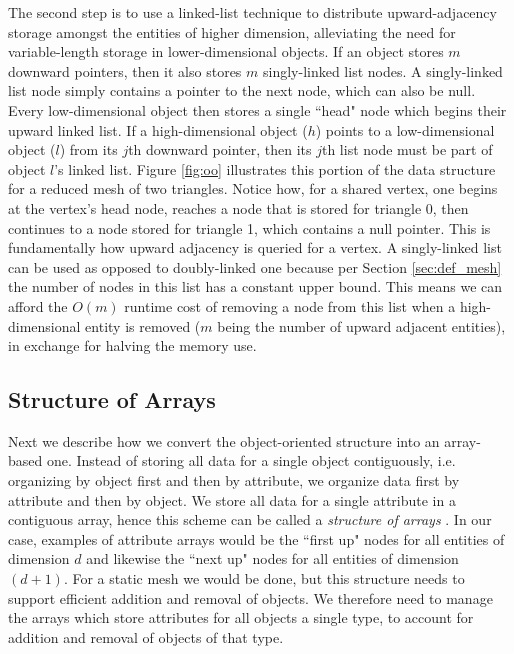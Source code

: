 The second step is to use a linked-list technique \cite{karamete2016novel}
to distribute upward-adjacency storage amongst the entities
of higher dimension, alleviating the need for variable-length
storage in lower-dimensional objects.
If an object stores $m$ downward pointers, then it also stores
$m$ singly-linked list nodes.
A singly-linked list node simply contains a pointer to the next
node, which can also be null.
Every low-dimensional object then stores a single ``head" node
which begins their upward linked list.
If a high-dimensional object ($h$) points to a low-dimensional object ($l$)
from its $j$th downward pointer, then its $j$th list node must be
part of object $l$'s linked list.
Figure \ref{fig:oo} illustrates this portion of the data structure
for a reduced mesh of two triangles.
Notice how, for a shared vertex, one begins at the vertex's head node,
reaches a node that is stored for triangle 0, then continues
to a node stored for triangle 1, which contains a null pointer.
This is fundamentally how upward adjacency is queried for a vertex.
A singly-linked list can be used as opposed to doubly-linked one
because per Section \ref{sec:def_mesh}
the number of nodes in this list has a constant upper bound.
This means we can afford the $O(m)$ runtime cost of removing a node from this
list when a high-dimensional entity is removed
($m$ being the number of upward adjacent entities),
in exchange for halving the memory use.

\subsection{Structure of Arrays}
\label{sec:sisc_soa}

Next we describe how we convert the object-oriented structure
into an array-based one.
Instead of storing all data for a single object contiguously,
i.e. organizing by object first and then by attribute,
we organize data first by attribute and then by object.
We store all data for a single attribute in a contiguous
array, hence this scheme can be called a {\it structure of arrays}
\cite{sung2012dl}.
In our case, examples of attribute arrays would be
the ``first up" nodes for all entities of dimension $d$
and likewise the ``next up" nodes for all entities of dimension $(d+1)$.
For a static mesh we would be done, but this structure needs
to support efficient addition and removal of objects.
We therefore need to manage the arrays which store attributes
for all objects a single type, to account for addition and removal
of objects of that type.

